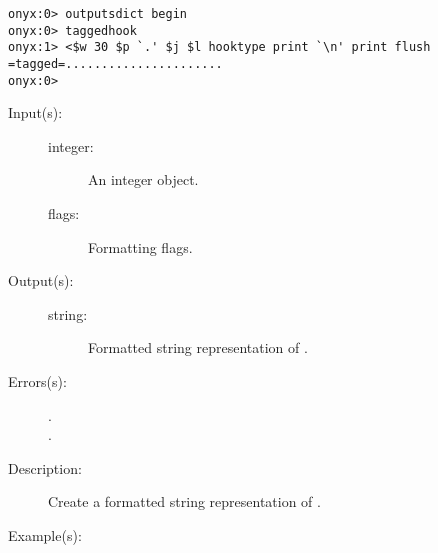 \begin{description}
\begin{description}
\begin{verbatim}
onyx:0> outputsdict begin
onyx:0> taggedhook
onyx:1> <$w 30 $p `.' $j $l hooktype print `\n' print flush
=tagged=......................
onyx:0>
		\end{verbatim}
	\end{description}
\label{outputsdict:integertype}
\item[{\onyxop{integer flags}{integertype}{string}}: ]
	\begin{description}\item[]
	\item[Input(s): ]
		\begin{description}\item[]
		\item[integer: ]
			An integer object.
		\item[flags: ]
			Formatting flags.
		\end{description}
	\item[Output(s): ]
		\begin{description}\item[]
		\item[string: ]
			Formatted string representation of .
		\end{description}
	\item[Errors(s): ]
		\begin{description}\item[]
		\item[.]
		\item[.]
		\end{description}
	\item[Description: ]
		Create a formatted string representation of .
	\item[Example(s): ]\begin{verbatim}


\end{verbatim}
\end{description}
\end{description}

